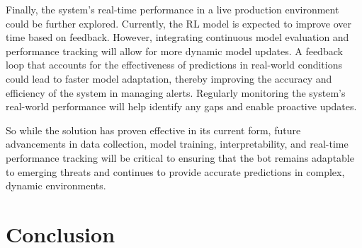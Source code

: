 Finally, the system's real-time performance in a live production environment could be further explored. 
Currently, the RL model is expected to improve over time based on feedback. 
However, integrating continuous model evaluation and performance tracking will allow for more dynamic model updates. 
A feedback loop that accounts for the effectiveness of predictions in real-world conditions could lead to faster model adaptation, thereby improving the accuracy and efficiency of the system in managing alerts. 
Regularly monitoring the system's real-world performance will help identify any gaps and enable proactive updates.

So while the solution has proven effective in its current form, future advancements in data collection, model training, interpretability, and real-time performance tracking will be critical to ensuring that the bot remains adaptable to emerging threats and continues to provide accurate predictions in complex, dynamic environments.

\section{Conclusion}
